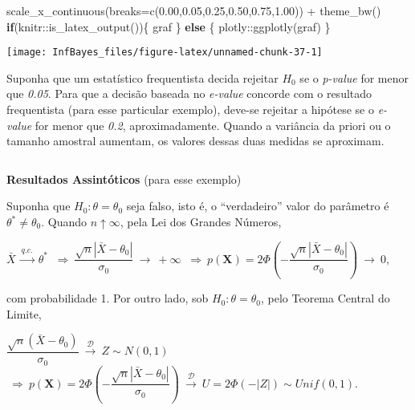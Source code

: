 \documentclass[
]{book}
\newenvironment{Shaded}{\begin{snugshade}}{\end{snugshade}}
\newcommand{\AttributeTok}[1]{\textcolor[rgb]{0.77,0.63,0.00}{#1}}
\newcommand{\ControlFlowTok}[1]{\textcolor[rgb]{0.13,0.29,0.53}{\textbf{#1}}}
\newcommand{\FloatTok}[1]{\textcolor[rgb]{0.00,0.00,0.81}{#1}}
\newcommand{\FunctionTok}[1]{\textcolor[rgb]{0.00,0.00,0.00}{#1}}
\newcommand{\NormalTok}[1]{#1}
\newcommand{\SpecialCharTok}[1]{\textcolor[rgb]{0.00,0.00,0.00}{#1}}
\begin{document}
\begin{Shaded}
\begin{Highlighting}[]
  \FunctionTok{scale\_x\_continuous}\NormalTok{(}\AttributeTok{breaks=}\FunctionTok{c}\NormalTok{(}\FloatTok{0.00}\NormalTok{,}\FloatTok{0.05}\NormalTok{,}\FloatTok{0.25}\NormalTok{,}\FloatTok{0.50}\NormalTok{,}\FloatTok{0.75}\NormalTok{,}\FloatTok{1.00}\NormalTok{)) }\SpecialCharTok{+}
  \FunctionTok{theme\_bw}\NormalTok{()}
\ControlFlowTok{if}\NormalTok{(knitr}\SpecialCharTok{::}\FunctionTok{is\_latex\_output}\NormalTok{())\{}
\NormalTok{  graf}
\NormalTok{\} }\ControlFlowTok{else}\NormalTok{ \{ plotly}\SpecialCharTok{::}\FunctionTok{ggplotly}\NormalTok{(graf) \}}
\end{Highlighting}
\end{Shaded}

\begin{center}\texttt{[image: InfBayes\_files/figure-latex/unnamed-chunk-37-1]} \end{center}

Suponha que um estatístico frequentista decida rejeitar \(H_0\) se o \emph{p-value} for menor que \emph{0.05}. Para que a decisão baseada no \emph{e-value} concorde com o resultado frequentista (para esse particular exemplo), deve-se rejeitar a hipótese se o \emph{e-value} for menor que \emph{0.2}, aproximadamente. Quando a variância da priori ou o tamanho amostral aumentam, os valores dessas duas medidas se aproximam.

\(~\)

\textbf{Resultados Assintóticos} (para esse exemplo)

Suponha que \(H_0: \theta=\theta_0\) seja falso, isto é, o ``verdadeiro'' valor do parâmetro é \(\theta^* \neq \theta_0\). Quando \(n\uparrow\infty\), pela Lei dos Grandes Números,

\(\bar{X} ~\overset{q.c.}{\longrightarrow}~ \theta^*\)
\(~\Longrightarrow~ \dfrac{\sqrt{n}|\bar{X}-\theta_0|}{{\sigma}_0} ~{\longrightarrow}~ +\infty\)
\(~\Longrightarrow~ p(\boldsymbol X)= 2\Phi\left(-\dfrac{\sqrt{n}|\bar{X}-\theta_0|}{{\sigma}_0}\right) ~{\longrightarrow}~ 0\),

com probabilidade 1. Por outro lado, sob \(H_0: \theta=\theta_0\), pelo Teorema Central do Limite,

\(\dfrac{\sqrt{n}(\bar{X}-\theta_0)}{{\sigma}_0} ~\overset{\mathcal{D}}\longrightarrow~ Z \sim N(0,1)\)
\(~\Longrightarrow~ p(\boldsymbol X)= 2\Phi\left(-\dfrac{\sqrt{n}|\bar{X}-\theta_0|}{{\sigma}_0}\right) ~\overset{\mathcal{D}}\longrightarrow~ U=2\Phi\left(-|Z|\right) \sim Unif(0,1)\).

\(~\)
\end{document}
